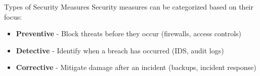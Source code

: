 \begin{definition}{Types of Security Measures}
Security measures can be categorized based on their focus:
\begin{itemize}
    \item \textbf{Preventive} - Block threats before they occur (firewalls, access controls)
    \item \textbf{Detective} - Identify when a breach has occurred (IDS, audit logs)
    \item \textbf{Corrective} - Mitigate damage after an incident (backups, incident response)
\end{itemize}
\end{definition}

\multend





\raggedcolumns




